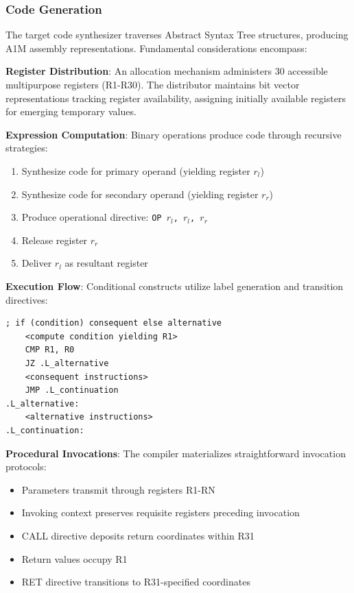 \documentclass[conference,10pt,twocolumn]{IEEEtran}
\begin{document}
\subsubsection{Code Generation}

The target code synthesizer traverses Abstract Syntax Tree structures, producing A1M assembly representations. Fundamental considerations encompass:

\textbf{Register Distribution}: An allocation mechanism administers 30 accessible multipurpose registers (R1-R30). The distributor maintains bit vector representations tracking register availability, assigning initially available registers for emerging temporary values.

\textbf{Expression Computation}: Binary operations produce code through recursive strategies:

\begin{enumerate}
\item Synthesize code for primary operand (yielding register $r_l$)
\item Synthesize code for secondary operand (yielding register $r_r$)
\item Produce operational directive: \texttt{OP $r_l$, $r_l$, $r_r$}
\item Release register $r_r$
\item Deliver $r_l$ as resultant register
\end{enumerate}

\textbf{Execution Flow}: Conditional constructs utilize label generation and transition directives:

\begin{lstlisting}[language={[x86masm]Assembler}, basicstyle=\small\ttfamily]
    ; if (condition) consequent else alternative
    <compute condition yielding R1>
    CMP R1, R0
    JZ .L_alternative
    <consequent instructions>
    JMP .L_continuation
.L_alternative:
    <alternative instructions>
.L_continuation:
\end{lstlisting}

\textbf{Procedural Invocations}: The compiler materializes straightforward invocation protocols:

\begin{itemize}
\item Parameters transmit through registers R1-RN
\item Invoking context preserves requisite registers preceding invocation
\item CALL directive deposits return coordinates within R31
\item Return values occupy R1
\item RET directive transitions to R31-specified coordinates
\end{itemize}
\end{document}

